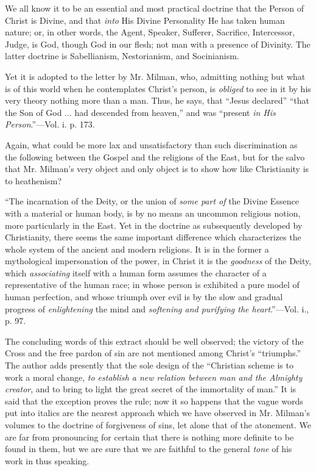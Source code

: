 We all know it to be an essential and most
practical doctrine that the Person of Christ is Divine, and that \emph{into}
His Divine Personality He has taken human nature; or, in other words,
the Agent, Speaker, Sufferer, Sacrifice, Intercessor, Judge, is God,
though God in our flesh; not man with a presence of Divinity. The
latter doctrine is Sabellianism, Nestorianism, and Socinianism.

Yet it is adopted to the letter by Mr. Milman,
who, admitting nothing but what is of this world when he contemplates
Christ's person, is \emph{obliged} to see in it by his very theory
nothing more than a man. Thus, he says, that ``Jesus declared'' ``that
the Son of God ... had descended from heaven,'' and was ``present \emph{in
His Person}.''—Vol. i. p. 173.

Again, what could be more lax and unsatisfactory
than such discrimination as the following between the Gospel and the
religions of the East, but for the salvo that Mr. Milman's very object
and only object is to show how like Christianity is to heathenism?

``The
incarnation of the Deity, or the union of \emph{some part of} the
Divine Essence with a material or human body, is by no means an
uncommon religious notion, more particularly in the East. Yet in the
doctrine as subsequently developed by Christianity, there seems the
same important difference which characterizes the whole system of the
ancient and modern religions. It is in the former a mythological
impersonation of the power, in Christ it is the \emph{goodness} of the
Deity, which \emph{associating} itself with a human form assumes the
character of a representative of the human race; in whose person is
exhibited a pure model of human perfection, and whose triumph over
evil is by the slow and gradual progress of \emph{enlightening} the
mind and \emph{softening and purifying the heart}.''—Vol. i., p. 97.

The concluding words of this extract should be
well observed; the victory of the Cross and the free pardon of sin are
not mentioned among Christ's ``triumphs.'' The author adds presently
that the sole design of the ``Christian scheme is to work a moral
change, \emph{to establish a new relation between man and the Almighty
creator}, and to bring to light the great secret of the immortality
of man.'' It is said that the exception proves the rule; now it so
happens that the vague words put into italics are the nearest approach
which we have observed in Mr. Milman's volumes to the doctrine of
forgiveness of sins, let alone that of the atonement. We are far
from pronouncing for certain that there is nothing more definite to be
found in them, but we are sure that we are faithful to the general \emph{tone}
of his work in thus speaking.

